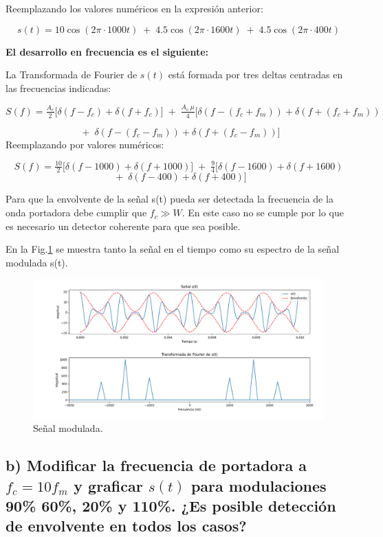 Reemplazando los valores numéricos en la expresión anterior:

    \[
        s(t) = 10\cos(2\pi \cdot 1000 t) \;+\; 4.5 \cos(2\pi \cdot 1600 t) \;+\; 4.5 \cos(2\pi \cdot 400 t)
    \]


\textbf{El desarrollo en frecuencia es el siguiente:}  

La Transformada de Fourier de \(s(t)\) está formada por tres deltas centradas en las frecuencias indicadas:

    \[
        S(f) = \tfrac{A_c}{2}\big[\delta(f-f_c)+\delta(f+f_c)\big] \;+\; 
        \tfrac{A_c \ \mu}{4}\big[\delta(f-(f_c+f_m))+\delta(f+(f_c+f_m))
    \]

    \[
        \;+\;
        \delta(f-(f_c-f_m))+\delta(f+(f_c-f_m))\big]
    \]
Reemplazando por valores numéricos:

    \[
        S(f) = \tfrac{10}{2}\big[\delta(f-1000)+\delta(f+1000)\big] \;+\; 
        \tfrac{9}{4}\big[\delta(f-1600) +\delta(f+1600)
    \]
    \[
        \;+\;
        \delta(f-400)+\delta(f+400)\big]
    \]

Para que la envolvente de la señal s(t) pueda ser detectada la frecuencia de la onda portadora debe cumplir que \(f_c \gg W\). En este caso no se cumple por lo que es necesario un detector coherente para que sea posible.

En la Fig.\ref{fig:actividad_2a} se muestra tanto la señal en el tiempo como su espectro de la señal modulada s(t).

    \begin{figure}[H]
        \centering
        \includegraphics[width=0.9\linewidth]{imagenes/Parte_1/Actividad_2/actividad_2a.png}
        \caption{Señal modulada.}
        \label{fig:actividad_2a}
    \end{figure}

    
\subsection*{b) Modificar la frecuencia de portadora a $f_c=10f_m$ y graficar $s(t)$ para modulaciones 90\% 60\%, 20\% y 110\%. ¿Es posible detección de envolvente en todos los casos? } 

